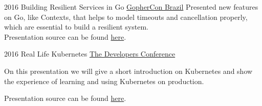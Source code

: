 \documentclass[]{friggeri-cv} %
\begin{document}
\begin{entrylist}
\entry
{2016}
{Building Resilient Services in Go}
{\href{https://2016.gopherconbr.org/en/}{GopherCon Brazil}}
{
Presented new features on Go, like Contexts, that helps to model timeouts and
cancellation properly, which are essential to build a resilient system.\\

Presentation source can be found \href{https://github.com/katcipis/my.presentations/tree/master/resilient-services-in-go}{here}.
}
\end{entrylist}

\begin{entrylist}
\entry
{2016}
{Real Life Kubernetes}
{\href{http://www.thedevelopersconference.com.br/tdc/2016/florianopolis/trilha-devops}{The Developers Conference}}
{
On this presentation we will give a short introduction on Kubernetes and show the experience of learning
and using Kubernetes on production.

Presentation source can be found \href{https://github.com/katcipis/my.presentations/tree/master/real-life-kubernetes}{here}.
}
\end{entrylist}

\end{document}
